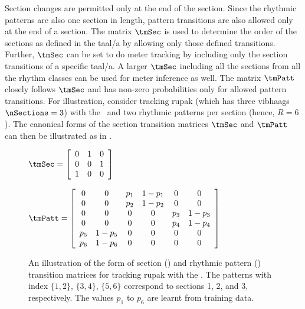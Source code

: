 Section changes are permitted only at the end of the section. Since the rhythmic patterns are also one section in length, pattern transitions are also allowed only at the end of a section. The matrix $\tmSec$ is used to determine the order of the sections as defined in the \gls{taal}/a by allowing only those defined transitions. Further, $\tmSec$ can be set to do meter tracking by including only the section transitions of a specific \gls{taal}/a. A larger $\tmSec$ including all the sections from all the rhythm classes can be used for meter inference as well. The matrix $\tmPatt$ closely follows $\tmSec$ and has non-zero probabilities only for allowed pattern transitions. For illustration, consider tracking \gls{rupak} (which has three \glspl{vibhaag} $\nSections = 3$) with the \spmodel\ and two rhythmic patterns per section (hence, $R = 6$). The canonical forms of the section transition matrices $\tmSec$ and $\tmPatt$ can then be illustrated as in . 
\begin{figure}
    \parbox{0.28\textwidth}{
      $\tmSec=\left[\begin{array}{ccc}
      0 & 1 & 0 \\
      0 & 0 & 1\\
      1 & 0 & 0 
    \end{array}\right]$}
    \begin{minipage}{0.6\textwidth}{
		\small
      $\tmPatt=\left[\begin{array}{cccccc}
      0 & 0 & p_{1} & 1-p_{1} & 0 & 0\\
      0 & 0 & p_{2} & 1-p_{2} & 0 & 0\\
      0 & 0 & 0 & 0 & p_{3} & 1-p_{3}\\
      0 & 0 & 0 & 0 & p_{4} & 1-p_{4}\\
      p_{5} & 1-p_{5} & 0 & 0 & 0 & 0\\
      p_{6} & 1-p_{6} & 0 & 0 & 0 & 0
      \end{array}\right]$}
		\normalsize	
    \end{minipage}
\caption[An illustration of the section pointer model transition matrices]{An illustration of the form of section (\tmSec) and rhythmic pattern (\tmPatt) transition matrices for tracking \gls{rupak} with the \spmodel. The patterns with index $\{1,2\}$, $\{3,4\}$, $\{5,6\}$ correspond to sections 1, 2, and 3, respectively. The values $p_1$ to $p_6$ are learnt from training data.}\label{fig:spm:transmat}
\end{figure}

